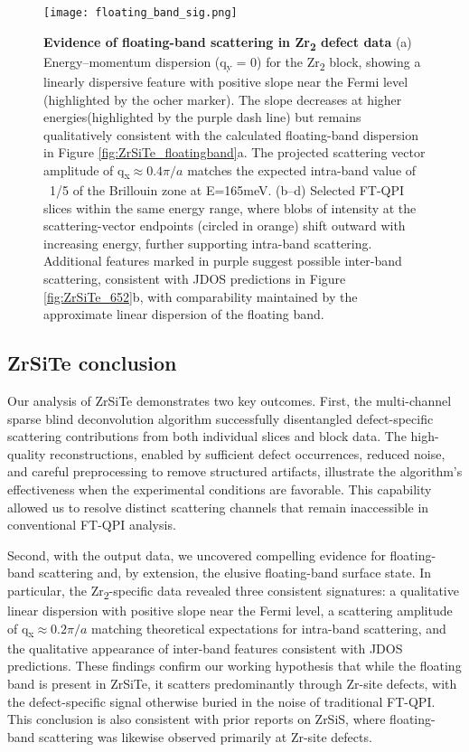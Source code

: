 \begin{figure}
	\texttt{[image: floating\_band\_sig.png]} 
	\centering
	\captionsetup{width=1.2\textwidth}
	\caption[\textbf{ Evidence of floating-band scattering in Zr\textsubscript{2} defect data}]{\textbf{ Evidence of floating-band scattering in Zr\textsubscript{2} defect data}
		(a) Energy–momentum dispersion (q\textsubscript{y} = 0) for the Zr\textsubscript{2} block, showing a linearly dispersive feature with positive slope near the Fermi level (highlighted by the ocher marker). The slope decreases at higher energies(highlighted by the purple dash line) but remains qualitatively consistent with the calculated floating-band dispersion in Figure \ref{fig:ZrSiTe_floatingband}a. The projected scattering vector amplitude of q\textsubscript{x}$\approx 0.4 \pi/a$ matches the expected intra-band value of ~1/5 of the Brillouin zone at 
		E=165meV. (b–d) Selected FT-QPI slices within the same energy range, where blobs of intensity at the scattering-vector endpoints (circled in orange) shift outward with increasing energy, further supporting intra-band scattering. Additional features marked in purple suggest possible inter-band scattering, consistent with JDOS predictions in Figure \ref{fig:ZrSiTe_652}b, with comparability maintained by the approximate linear dispersion of the floating band.}
	\label{fig:Zr2_floatingband}
\end{figure}

\subsection{ZrSiTe conclusion}
Our analysis of ZrSiTe demonstrates two key outcomes. First, the multi-channel sparse blind deconvolution algorithm successfully disentangled defect-specific scattering contributions from both individual slices and block data. The high-quality reconstructions, enabled by sufficient defect occurrences, reduced noise, and careful preprocessing to remove structured artifacts, illustrate the algorithm’s effectiveness when the experimental conditions are favorable. This capability allowed us to resolve distinct scattering channels that remain inaccessible in conventional FT-QPI analysis.

Second, with the output data, we uncovered compelling evidence for floating-band scattering and, by extension, the elusive floating-band surface state. In particular, the Zr\textsubscript{2}-specific data revealed three consistent signatures: a qualitative linear dispersion with positive slope near the Fermi level, a scattering amplitude of q\textsubscript{x}$\approx 0.2\pi/a$ matching theoretical expectations for intra-band scattering, and the qualitative appearance of inter-band features consistent with JDOS predictions. These findings confirm our working hypothesis that while the floating band is present in ZrSiTe, it scatters predominantly through Zr-site defects, with the defect-specific signal otherwise buried in the noise of traditional FT-QPI. This conclusion is also consistent with prior reports on ZrSiS, where floating-band scattering was likewise observed primarily at Zr-site defects.

